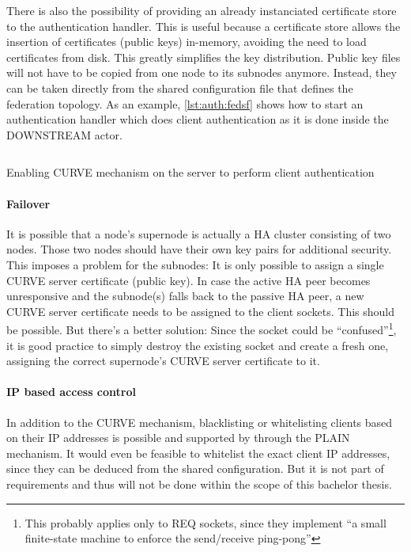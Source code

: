 There is also the possibility of providing an already instanciated certificate
store to the authentication handler. This is useful because a certificate store
allows the insertion of certificates (public keys) in-memory, avoiding the need
to load certificates from disk. This greatly simplifies the key distribution.
Public key files will not have to be copied from one node to its subnodes
anymore. Instead, they can be taken directly from the shared configuration file
that defines the federation topology. As an example, \autoref{lst:auth:fedsf}
shows how to start an authentication handler which does client authentication
as it is done inside the DOWNSTREAM actor.

\begin{listing}
	\inputminted[bgcolor=bg]{Ruby}{listings/auth/fedsf.rb}
	\caption{Enabling CURVE mechanism on the server to perform client authentication}
	\label{lst:auth:fedsf}
\end{listing}

\paragraph{Failover}\label{sec:approach:encryption:ha}
It is possible that a node's supernode is actually a HA cluster consisting of
two nodes. Those two nodes should have their own key pairs for additional
security. This imposes a problem for the subnodes: It is only possible to assign
a single CURVE server certificate (public key). In case the active HA peer becomes
unresponsive and the subnode(s) falls back to the passive HA peer, a new CURVE
server certificate needs to be assigned to the client sockets. This should be
possible. But there's a better solution:
Since the socket could be \cite[Binary Star Implementation, Binary Star client
in C]{zmq:zguide} ``confused''\footnote{This probably applies only to REQ
sockets, since they implement \cite[Client-Side Reliability (Lazy Pirate
Pattern)]{zmq:zguide} ``a small finite-state machine to enforce the
send/receive ping-pong''}, it is good practice to simply destroy the existing
socket and create a fresh one, assigning the correct supernode's CURVE server
certificate to it.

\paragraph{IP based access control}
In addition to the CURVE mechanism, blacklisting or whitelisting clients based
on their \gls{IP} addresses is possible and supported by
 through the PLAIN mechanism. It would even be
feasible to whitelist the exact client IP addresses, since they can be deduced
from the shared configuration. But it is not part of requirements and thus will not
be done within the scope of this bachelor thesis.

